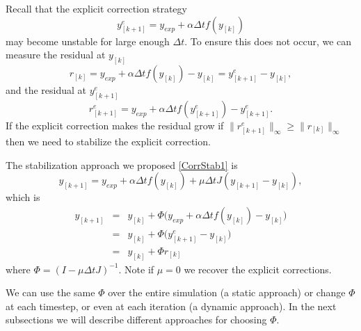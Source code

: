 \documentclass{siamart251104}
\newcommand{\dt}{\Delta t}
\begin{document}
Recall that the explicit correction strategy
\[ y^e_{[k+1]}  =  y_{exp} + \alpha \dt f(y_{[k]}) 
\]
may become unstable for large enough $\dt$.
To ensure this does not occur, we can measure
the residual at $y_{[k]}$
\[ r_{[k]} = y_{exp} + \alpha \dt f(y_{[k]}) - y_{[k]} = y^e_{[k+1]} - y_{[k]},\]
and the residual at $y^e_{[k+1]}$
\[ r^e_{[k+1]} = y_{exp} + \alpha \dt f(y^e_{[k+1]}) - y^e_{[k+1]}.\]
If the explicit correction makes the residual grow 
if $\|r^e_{[k+1]}\|_\infty \geq \|r_{[k]}\|_\infty  $ 
then we need to stabilize the explicit correction.

The stabilization approach we proposed 
\eqref{CorrStab1}  is
\[ y_{[k+1]}  =  y_{exp}  + \alpha \dt f(y_{[k]}) +
\mu \dt J  \left(y_{[k+1]} - y_{[k]} \right) ,
\]
which is
\begin{eqnarray*}
y_{[k+1]} & = & y_{[k]}
+ \Phi
\big(y_{exp}  + \alpha \dt f(y_{[k]})  - y_{[k]}
\big) \\
& = & y_{[k]} + \Phi \big( y^e_{[k+1]}  - y_{[k]} \big) \\
& = & y_{[k]} + \Phi r_{[k]}
\end{eqnarray*} 
where $\Phi = \left(I - \mu \dt J\right)^{-1}$.
Note if $\mu =0$ we recover the explicit corrections. 





We can use the same $\Phi$ over the entire simulation (a static approach) or change 
$\Phi$ at each timestep, or even at each iteration (a dynamic approach).
In the next subsections we will describe different approaches for choosing $\Phi$. 
\end{document}
